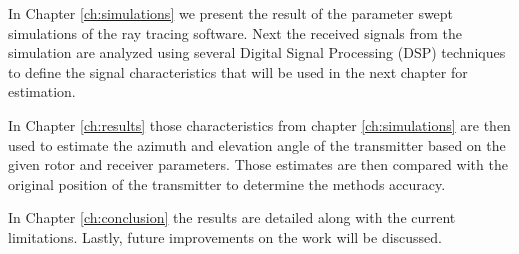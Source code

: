 In Chapter \ref{ch:simulations} we present the result of the parameter swept simulations of the ray tracing software. Next the received signals from the simulation are analyzed using several Digital Signal Processing (DSP) techniques to define the signal characteristics that will be used in the next chapter for estimation. 

In Chapter  \ref{ch:results} those characteristics from chapter \ref{ch:simulations} are then used to estimate the azimuth and elevation angle of the transmitter based on the given rotor and receiver parameters. Those estimates are then compared with the original position of the transmitter to determine the methods accuracy.

In Chapter \ref{ch:conclusion} the results are detailed along with the current limitations. Lastly, future improvements on the work will be discussed.